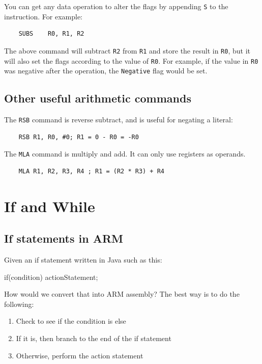 You can get any data operation to alter the flags by appending {\tt S} to the instruction. For example:

\begin{verbatim}
	SUBS	R0, R1, R2
\end{verbatim}

The above command will subtract {\tt R2} from {\tt R1} and store the result in {\tt R0}, but it will also set the flags according to the value of {\tt R0}. For example, if the value in {\tt R0} was negative after the operation, the {\tt Negative} flag would be set.

\subsection{Other useful arithmetic commands}

The {\tt RSB} command is reverse subtract, and is useful for negating a literal:

\begin{verbatim}
	RSB	R1, R0, #0; R1 = 0 - R0 = -R0
\end{verbatim}

The {\tt MLA} command is multiply and add. It can only use registers as operands.

\begin{verbatim}
	MLA	R1, R2, R3, R4 ; R1 = (R2 * R3) + R4
\end{verbatim}

\section{If and While}

\subsection{If statements in ARM}

Given an if statement written in Java such as this:

\begin{listing}{1}
if(condition)
{
    actionStatement;
}
\end{listing}

How would we convert that into ARM assembly? The best way is to do the following:

\begin{enumerate}

	\item Check to see if the condition is else

	\item If it is, then branch to the end of the if statement

	\item Otherwise, perform the action statement

\end{enumerate}

